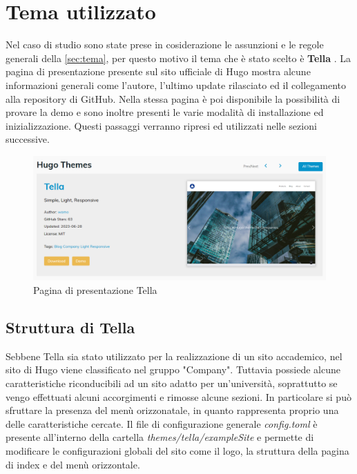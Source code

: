 \documentclass[target=bach,aauheader=]{thud}
\begin{document}
\section{Tema utilizzato}
Nel caso di studio sono state prese in cosiderazione le assunzioni e le regole generali della \cref{sec:tema}, per questo motivo il tema che è stato scelto è \textbf{Tella} \cite{tella-site}.
La pagina di presentazione presente sul sito ufficiale di Hugo mostra alcune informazioni generali come l'autore, l'ultimo update rilasciato ed il collegamento alla repository di GitHub.
\newline
Nella stessa pagina è poi disponibile la possibilità di provare la demo e sono inoltre presenti le varie modalità di installazione ed inizializzazione. Questi passaggi verranno ripresi ed utilizzati nelle sezioni successive.

\begin{figure}
    \centering
    \includegraphics[width = 1\textwidth]{images/Tella.png}
    \caption{Pagina di presentazione Tella}
\end{figure}


\subsection{Struttura di Tella}
Sebbene Tella sia stato utilizzato per la realizzazione di un sito accademico, nel sito di Hugo viene classificato nel gruppo "Company". Tuttavia possiede alcune caratteristiche riconducibili ad un sito adatto per un'università, soprattutto se vengo effettuati alcuni accorgimenti
e rimosse alcune sezioni. 
In particolare si può sfruttare la presenza del menù orizzonatale, in quanto rappresenta proprio una delle caratteristiche cercate. 
\newline
Il file di configurazione generale \textit{config.toml} è presente all'interno della cartella \textit{themes/tella/exampleSite} e permette di modificare le configurazioni globali del sito come il logo, la struttura della pagina di index e del menù orizzontale.
\end{document}
